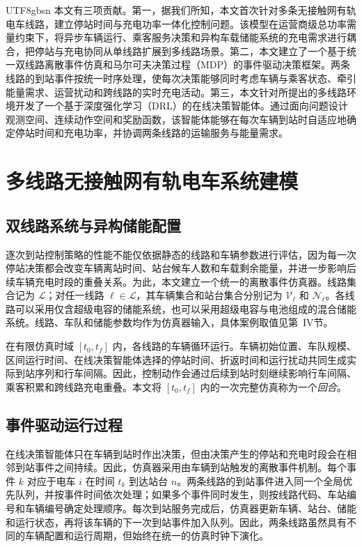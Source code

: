 \documentclass[conference]{IEEEtran}
\begin{document}
\begin{CJK*}{UTF8}{gbsn}
本文有三项贡献。第一，据我们所知，本文首次针对多条无接触网有轨电车线路，建立停站时间与充电功率一体化控制问题。该模型在运营商级总功率需量约束下，将异步车辆运行、乘客服务决策和异构车载储能系统的充电需求进行耦合，把停站与充电协同从单线路扩展到多线路场景。第二，本文建立了一个基于统一双线路离散事件仿真和马尔可夫决策过程（MDP）的事件驱动决策框架。两条线路的到站事件按统一时序处理，使每次决策能够同时考虑车辆与乘客状态、牵引能量需求、运营扰动和跨线路的实时充电活动。第三，本文针对所提出的多线路环境开发了一个基于深度强化学习（DRL）的在线决策智能体。通过面向问题设计观测空间、连续动作空间和奖励函数，该智能体能够在每次车辆到站时自适应地确定停站时间和充电功率，并协调两条线路的运输服务与能量需求。

\section{多线路无接触网有轨电车系统建模}
\subsection{双线路系统与异构储能配置}
逐次到站控制策略的性能不能仅依据静态的线路和车辆参数进行评估，因为每一次停站决策都会改变车辆离站时间、站台候车人数和车载剩余能量，并进一步影响后续车辆充电时段的重叠关系。为此，本文建立一个统一的离散事件仿真器。线路集合记为 $\mathcal{L}$；对任一线路 $\ell\in\mathcal{L}$，其车辆集合和站台集合分别记为 $\mathcal{V}_{\ell}$ 和 $\mathcal{N}_{\ell}$。各线路可以采用仅含超级电容的储能系统，也可以采用超级电容与电池组成的混合储能系统。线路、车队和储能参数均作为仿真器输入，具体案例取值见第~IV节。

在有限仿真时域 $[t_0,t_f]$ 内，各线路的车辆循环运行。车辆初始位置、车队规模、区间运行时间、在线决策智能体选择的停站时间、折返时间和运行扰动共同生成实际到站序列和行车间隔。因此，控制动作会通过后续到站时刻继续影响行车间隔、乘客积累和跨线路充电重叠。本文将 $[t_0,t_f]$ 内的一次完整仿真称为一个\emph{回合}。

\subsection{事件驱动运行过程}
在线决策智能体只在车辆到站时作出决策，但由决策产生的停站和充电时段会在相邻到站事件之间持续。因此，仿真器采用由车辆到站触发的离散事件机制。每个事件 $k$ 对应于电车 $i$ 在时间 $t_k$ 到达站台 $n$。两条线路的到站事件进入同一个全局优先队列，并按事件时间依次处理；如果多个事件同时发生，则按线路代码、车站编号和车辆编号确定处理顺序。每次到站服务完成后，仿真器更新车辆、站台、储能和运行状态，再将该车辆的下一次到站事件加入队列。因此，两条线路虽然具有不同的车辆配置和运行周期，但始终在统一的仿真时钟下演化。


\end{CJK*}
\end{document}
